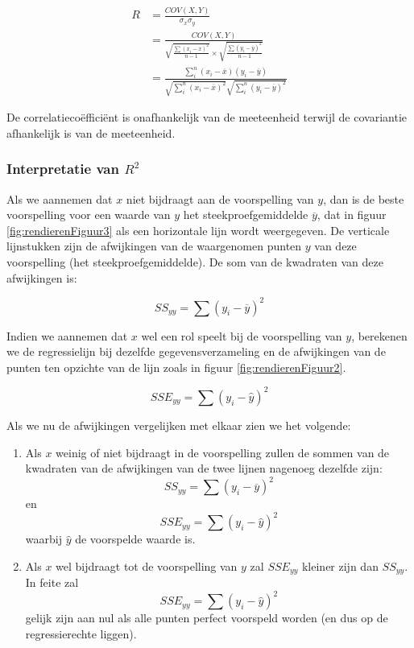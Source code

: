 \begin{align}
  R &=\frac{COV(X,Y)}{\sigma_{x}\sigma_{y}} \\
    &= \frac{COV(X,Y)}{\sqrt{\frac{\sum(x_{i} - \overline{x})^{2}}{n-1}} \times \sqrt{\frac{\sum(y_{i} - \overline{y})^{2}}{n-1}}} \\
    &= \frac{\sum_{i}^{n}(x_{i}-\overline{x})(y_{i} - \overline{y})}{\sqrt{\sum_{i}^{n} (x_{i}-\overline{x})^{2}} \sqrt{\sum_{i}^{n} (y_{i}-\overline{y})^{2}}}
  \label{eq:relCovar}
\end{align}

De correlatieco\"effici\"ent is onafhankelijk van de meeteenheid terwijl de covariantie afhankelijk is van de meeteenheid.

\subsubsection{Interpretatie van $R^{2}$}

Als we aannemen dat $x$ niet bijdraagt aan de voorspelling van $y$, dan is de beste voorspelling voor een waarde van $y$ het steekproefgemiddelde $\overline{y}$, dat in figuur \ref{fig:rendierenFiguur3} als een horizontale lijn wordt weergegeven. De verticale lijnstukken zijn de afwijkingen van de waargenomen punten $y$ van deze voorspelling (het steekproefgemiddelde). De som van de kwadraten van deze afwijkingen is:

\[ SS_{yy} = \sum(y_{i} - \overline{y})^{2} \]

Indien we aannemen dat $x$ wel een rol speelt bij de voorspelling van $y$, berekenen we de regressielijn bij dezelfde gegevensverzameling en de afwijkingen van de punten ten opzichte van de lijn zoals in figuur \ref{fig:rendierenFiguur2}.

\[ SSE_{yy} = \sum(y_{i} - \widehat{y})^{2} \]

 Als we nu de afwijkingen vergelijken met elkaar zien we het volgende:
\begin{enumerate}
  \item Als $x$ weinig of niet bijdraagt in de voorspelling zullen de sommen van de kwadraten van de afwijkingen van de twee lijnen nagenoeg dezelfde zijn:
    \[ SS_{yy} = \sum(y_{i} - \overline{y})^{2} \] en
    \[ SSE_{yy} = \sum(y_{i} - \widehat{y})^{2} \]
    waarbij $\widehat{y}$ de voorspelde waarde is.
  \item Als $x$ wel bijdraagt tot de voorspelling van $y$ zal $SSE_{yy}$ kleiner zijn dan $SS_{yy}$. In feite zal
    \[	SSE_{yy} = \sum(y_{i} - \widehat{y})^{2} \]
    gelijk zijn aan nul als alle punten perfect voorspeld worden (en dus op de regressierechte liggen).
\end{enumerate}

